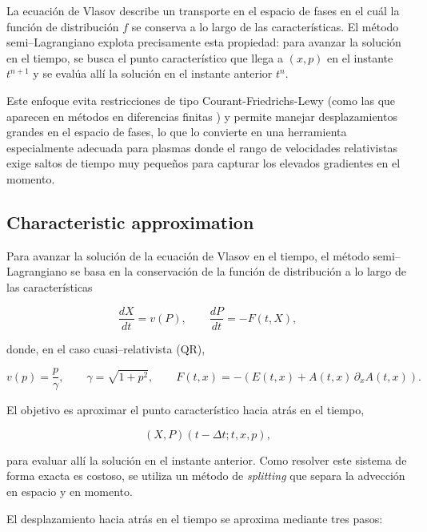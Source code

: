 \documentclass[11pt,a4paper,twoside,pdf]{article}
\numberwithin{equation}{section}
\begin{document}
La ecuación de Vlasov describe un transporte en el espacio de fases en el cuál la
función de distribución $f$ se conserva a lo largo de las características. El método
semi–Lagrangiano explota precisamente esta propiedad: para avanzar la solución en
el tiempo, se busca el punto característico que llega a $(x,p)$ en el instante $t^{n+1}$ y
se evalúa allí la solución en el instante anterior $t^n$.

Este enfoque evita restricciones de tipo Courant-Friedrichs-Lewy (como las que aparecen en métodos en diferencias finitas \cite{dymer2025stable}) y permite manejar desplazamientos
grandes en el espacio de fases, lo que lo convierte en una herramienta especialmente
adecuada para plasmas donde el rango de velocidades relativistas exige saltos de tiempo muy pequeños para capturar los elevados gradientes en el momento.






\subsection{Characteristic approximation}

Para avanzar la solución de la ecuación de Vlasov en el tiempo, el método
semi–Lagrangiano se basa en la conservación de la función de distribución a lo largo
de las características 


\[
\frac{dX}{dt} = v(P), \qquad \frac{dP}{dt} = -F(t,X),
\]


donde, en el caso cuasi–relativista (QR),


\[
v(p) = \frac{p}{\gamma}, \qquad \gamma = \sqrt{1+p^2}, \qquad
F(t,x) = -(E(t,x) + A(t,x)\,\partial_x A(t,x)).
\]



El objetivo es aproximar el punto característico hacia atrás en el tiempo,


\[
(X,P)(t-\Delta t;t,x,p),
\]


para evaluar allí la solución en el instante anterior. Como resolver este sistema de
forma exacta es costoso, se utiliza un método de \emph{splitting} que separa la
advección en espacio y en momento.


El desplazamiento hacia atrás en el tiempo se aproxima mediante tres pasos:
\end{document}
